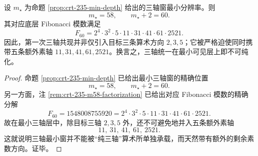 \begin{theorem}[三轴最小窗的非纯化定理]\label{thm:xi-time-part64b-three-axis-minimum-window-non-purification}
设 \(m_\star\) 为命题 \ref{prop:crt-235-min-depth} 给出的三轴窗最小分辨率。则
\[
\boxed{\;
m_\star=58,
\qquad
m_\star+2=60.\;}
\]
其对应底层 Fibonacci 模数满足
\[
\boxed{\;
F_{60}
=
2^4\cdot 3^2\cdot 5\cdot 11\cdot 31\cdot 41\cdot 61\cdot 2521.\;}
\]
因此，第一次三轴共现并非仅引入目标三条算术方向 \(2,3,5\)；它被严格迫使同时携带五条额外素轴 \(11,31,41,61,2521\)。换言之，三轴统一在最小可见层上即不可纯化。
\end{theorem}
\begin{proof}
命题 \ref{prop:crt-235-min-depth} 已给出最小三轴窗的精确位置
\[
m_\star=58,
\qquad
m_\star+2=60.
\]
另一方面，注 \ref{rem:crt-235-m58-factorization} 已给出对应 Fibonacci 模数的精确分解
\[
F_{60}
=
1548008755920
=
2^4\cdot 3^2\cdot 5\cdot 11\cdot 31\cdot 41\cdot 61\cdot 2521.
\]
故在最小三轴层中，除目标三轴 \(2,3,5\) 外，还不可避免地并入五条额外素轴
\[
11,\ 31,\ 41,\ 61,\ 2521.
\]
这就说明三轴最小窗并不能被“纯三轴”算术所单独承载，而天然带有额外的剩余素数方向。证毕。
\end{proof}

